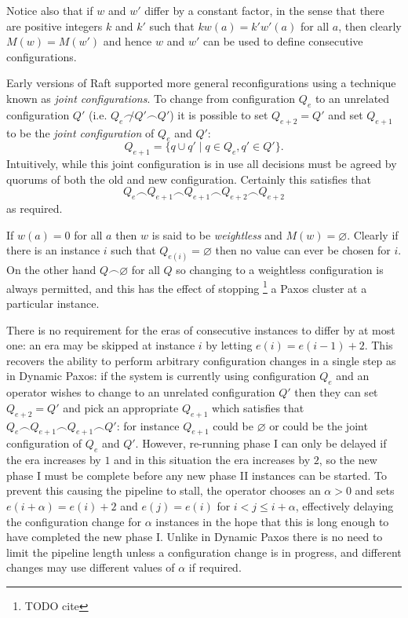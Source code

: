\documentclass[journal]{IEEEtran}
\begin{document}
Notice also that if $w$ and $w'$ differ by a constant factor, in the sense that
there are positive integers $k$ and $k'$ such that $k w(a) = k' w'(a)$ for all
$a$, then clearly ${M(w) = M(w')}$ and hence $w$ and $w'$ can be used to define
consecutive configurations.

Early versions of Raft supported more general reconfigurations using a
technique known as \textit{joint configurations}. To change from configuration
$Q_{e}$ to an unrelated configuration $Q'$ (i.e.  $Q_{e} \not\frown Q' \frown
Q'$) it is possible to set $Q_{e+2} = Q'$ and set $Q_{e+1}$ to be the
\textit{joint configuration} of $Q_{e}$ and $Q'$: \[Q_{e+1} = \{ q \cup q' \mid
q \in Q_{e}, q' \in Q' \}.\] Intuitively, while this joint configuration is in
use all decisions must be agreed by quorums of both the old and new
configuration. Certainly this satisfies that \[Q_{e} \frown Q_{e + 1} \frown
Q_{e+1} \frown Q_{e + 2} \frown Q_{e + 2}\] as required.

If $w(a) = 0$ for all $a$ then $w$ is said to be \textit{weightless} and $M(w)
= \varnothing$. Clearly if there is an instance $i$ such that $Q_{e(i)} =
\varnothing$ then no value can ever be chosen for $i$. On the other hand $Q
\frown \varnothing$ for all $Q$ so changing to a weightless configuration is
always permitted, and this has the effect of stopping \footnote{TODO cite} a
Paxos cluster at a particular instance.

There is no requirement for the eras of consecutive instances to differ by at
most one: an era may be skipped at instance $i$ by letting $e(i) = e(i-1) + 2$.
This recovers the ability to perform arbitrary configuration changes in a
single step as in Dynamic Paxos: if the system is currently using configuration
$Q_{e}$ and an operator wishes to change to an unrelated configuration $Q'$
then they can set $Q_{e+2} = Q'$ and pick an appropriate $Q_{e+1}$ which
satisfies that $Q_{e} \frown Q_{e + 1} \frown Q_{e+1} \frown Q'$: for instance
$Q_{e+1}$ could be $\varnothing$ or could be the joint configuration of $Q_{e}$
and $Q'$.  However, re-running phase I can only be delayed if the era increases
by $1$ and in this situation the era increases by $2$, so the new phase I must
be complete before any new phase II instances can be started.  To prevent this
causing the pipeline to stall, the operator chooses an $\alpha > 0$ and sets
$e(i+\alpha) = e(i)+2$ and $e(j) = e(i)$ for $i < j \le i + \alpha$,
effectively delaying the configuration change for $\alpha$ instances in the
hope that this is long enough to have completed the new phase I. Unlike in
Dynamic Paxos there is no need to limit the pipeline length unless a
configuration change is in progress, and different changes may use different
values of $\alpha$ if required.
\end{document}
